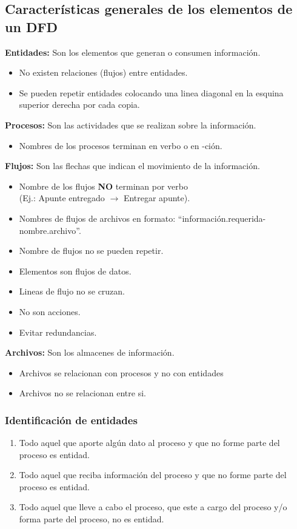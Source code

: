 \documentclass{templateNote}
\begin{document}
\subsection{Características generales de los elementos de un DFD}
\noindent\textbf{Entidades:} Son los elementos que generan o consumen información.
\begin{itemize}
    \item No existen relaciones (flujos) entre entidades.
    \item Se pueden repetir entidades colocando una linea diagonal en la esquina superior derecha por cada copia.
\end{itemize}
\textbf{Procesos:} Son las actividades que se realizan sobre la información.
\begin{itemize}
    \item Nombres de los procesos terminan en verbo o en -ción.
\end{itemize}
\textbf{Flujos:} Son las flechas que indican el movimiento de la información.
\begin{itemize}
    \item Nombre de los flujos \textbf{NO} terminan por verbo \\(Ej.: Apunte entregado $\rightarrow$ Entregar apunte).
    \item Nombres de flujos de archivos en formato: ``información.requerida-nombre.archivo''.
    \item Nombre de flujos no se pueden repetir.
    \item Elementos son flujos de datos.
    \item Lineas de flujo no se cruzan.
    \item No son acciones.
    \item Evitar redundancias.
\end{itemize}
\textbf{Archivos:} Son los almacenes de información.
\begin{itemize}
    \item Archivos se relacionan con procesos y no con entidades
    \item Archivos no se relacionan entre si.
\end{itemize}
\subsubsection{Identificación de entidades}
\begin{enumerate}
    \item Todo aquel que aporte algún dato al proceso y que no forme parte del proceso es entidad.
    \item Todo aquel que reciba información del proceso y que no forme parte del proceso es entidad.
    \item Todo aquel que lleve a cabo el proceso, que este a cargo del proceso y/o forma parte del proceso, no es entidad.
\end{enumerate}
\end{document}
